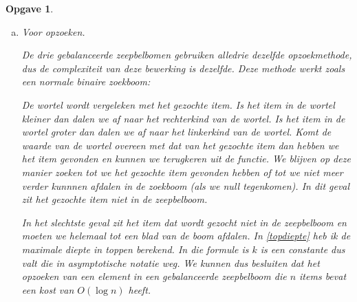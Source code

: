 \documentclass[12pt,hidelinks]{article}
\newtheorem{opgave}{Opgave}
\begin{document}
\begin{opgave}
\begin{enumerate}[a.]
            \item Voor opzoeken. 
                \label{opzoeken}

                \normalfont
                De drie gebalanceerde zeepbelbomen gebruiken alledrie dezelfde opzoekmethode, dus de complexiteit van deze bewerking is dezelfde.
                Deze methode werkt zoals een normale binaire zoekboom: 

                De wortel wordt vergeleken met het gezochte item. Is het item in de wortel kleiner dan dalen we af naar het rechterkind van de wortel. 
                Is het item in de wortel groter dan dalen we af naar het linkerkind van de wortel.
                Komt de waarde van de wortel overeen met dat van het gezochte item dan hebben we het item gevonden en kunnen we terugkeren uit de functie.
                We blijven op deze manier zoeken tot we het gezochte item gevonden hebben of tot we niet meer verder kunnnen afdalen in de zoekboom (als we null tegenkomen).
                In dit geval zit het gezochte item niet in de zeepbelboom.

                In het slechtste geval zit het item dat wordt gezocht niet in de zeepbelboom en moeten we helemaal tot een blad van de boom afdalen.
                In \eqref{topdiepte} heb ik de maximale diepte in toppen berekend.
                In die formule is $k$ is een constante dus valt die in asymptotische notatie weg.
                We kunnen dus besluiten dat het opzoeken van een element in een gebalanceerde zeepbelboom die $n$ items bevat een kost van $O(\log n)$ heeft.
        \end{enumerate}
    \end{opgave}
\end{document}
